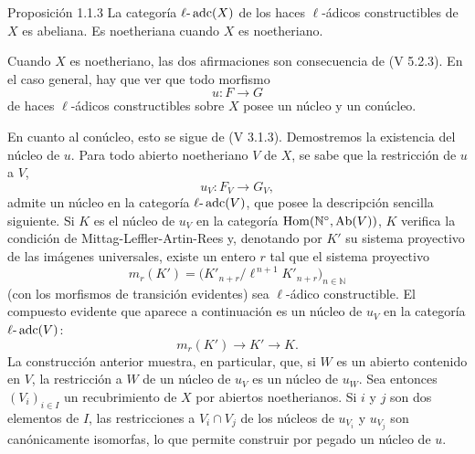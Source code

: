 \begin{statement}{Proposición 1.1.3}
La categoría \(\ell\text{-}\operatorname{adc}(X)\) de los haces \(\ell\)-ádicos constructibles de \(X\) es abeliana. Es noetheriana cuando \(X\) es noetheriano.
\end{statement}

\begin{prooftext}[Demostración]
Cuando \(X\) es noetheriano, las dos afirmaciones son consecuencia de (V 5.2.3). En el caso general, hay que ver que todo morfismo
\[
u:F\longrightarrow G
\]
de haces \(\ell\)-ádicos constructibles sobre \(X\) posee un núcleo y un conúcleo.

En cuanto al conúcleo, esto se sigue de (V 3.1.3). Demostremos la existencia del núcleo de \(u\). Para todo abierto noetheriano \(V\) de \(X\), se sabe que la restricción de \(u\) a \(V\),
\[
u_V:F_V\longrightarrow G_V,
\]
admite un núcleo en la categoría \(\ell\text{-}\operatorname{adc}(V)\), que posee la descripción sencilla siguiente. Si \(K\) es el núcleo de \(u_V\) en la categoría \(\operatorname{Hom}(\mathbb N^\circ,\operatorname{Ab}(V))\), \(K\) verifica la condición de Mittag-Leffler-Artin-Rees y, denotando por \(K'\) su sistema proyectivo de las imágenes universales, existe un entero \(r\) tal que el sistema proyectivo
\[
m_r(K')=\bigl(K'_{n+r}/\ell^{\,n+1}K'_{n+r}\bigr)_{n\in\mathbb N}
\]
(con los morfismos de transición evidentes) sea \(\ell\)-ádico constructible. El compuesto evidente que aparece a continuación es un núcleo de \(u_V\) en la categoría \(\ell\text{-}\operatorname{adc}(V)\):
\[
m_r(K')\longrightarrow K'\longrightarrow K.
\]
La construcción anterior muestra, en particular, que, si \(W\) es un abierto contenido en \(V\), la restricción a \(W\) de un núcleo de \(u_V\) es un núcleo de \(u_W\). Sea entonces \((V_i)_{i\in I}\) un recubrimiento de \(X\) por abiertos noetherianos. Si \(i\) y \(j\) son dos elementos de \(I\), las restricciones a \(V_i\cap V_j\) de los núcleos de \(u_{V_i}\) y \(u_{V_j}\) son canónicamente isomorfas, lo que permite construir por pegado un núcleo de \(u\).
\end{prooftext}
